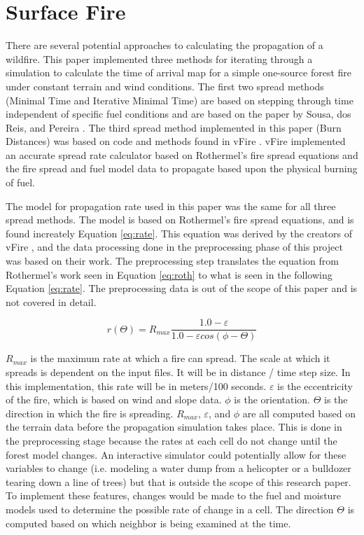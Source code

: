 \section{Surface Fire}
There are several potential approaches to calculating the propagation of a wildfire. This paper implemented three methods for iterating through a simulation to calculate the time of arrival map for a simple one-source forest fire under constant terrain and wind conditions. The first two spread methods (Minimal Time and Iterative Minimal Time) are based on stepping through time independent of specific fuel conditions and are based on the paper by Sousa, dos Reis, and Pereira \cite{gpufire}. The third spread method implemented in this paper (Burn Distances) was based on code and methods found in vFire \cite{vFire}. vFire implemented an accurate spread rate calculator based on Rothermel's fire spread equations and the fire spread and fuel model data to propagate based upon the physical burning of fuel.

The model for propagation rate used in this paper was the same for all three spread methods. The model is based on Rothermel's fire spread equations, and is found increately Equation \ref{eq:rate}. This equation was derived by the creators of vFire \cite{vFire}, and the data processing done in the preprocessing phase of this project was based on their work. The preprocessing step translates the equation from Rothermel's work seen in Equation \ref{eq:roth} to what is seen in the following Equation \ref{eq:rate}. The preprocessing data is out of the scope of this paper and is not covered in detail. 

\begin{equation}
r(\Theta ) = R_{max}\frac{1.0 - \varepsilon }{1.0 - \varepsilon cos(\phi-\Theta )}
\label{eq:rate}
\end{equation}

$R_{max}$ is the maximum rate at which a fire can spread. The scale at which it spreads is dependent on the input files. It will be in distance / time step size. In this implementation, this rate will be in meters/100 seconds. $\varepsilon$ is the eccentricity of the fire, which is based on wind and slope data. $\phi$ is the orientation. $\Theta$ is the direction in which the fire is spreading. $R_{max}$, $\varepsilon$, and $\phi$ are all computed based on the terrain data before the propagation simulation takes place. This is done in the preprocessing stage because the rates at each cell do not change until the forest model changes. An interactive simulator could potentially allow for these variables to change (i.e. modeling a water dump from a helicopter or a bulldozer tearing down a line of trees) but that is outside the scope of this research paper. To implement these features, changes would be made to the fuel and moisture models used to determine the possible rate of change in a cell. The direction $\Theta$ is computed based on which neighbor is being examined at the time. 

